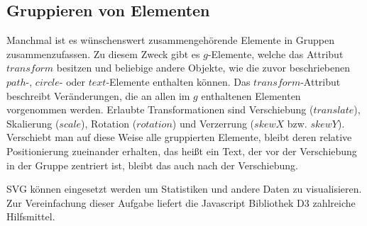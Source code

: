 \subsection{Gruppieren von Elementen}
Manchmal ist es wünschenswert zusammengehörende Elemente in Gruppen zusammenzufassen. Zu diesem Zweck gibt es $g$-Elemente, welche das Attribut $transform$ besitzen und beliebige andere Objekte, wie die zuvor beschriebenen $path$-, $circle$- oder $text$-Elemente enthalten können. Das $transform$-Attribut beschreibt Veränderungen, die an allen im $g$ enthaltenen Elementen vorgenommen werden. Erlaubte Transformationen sind  Verschiebung ($translate$), Skalierung ($scale$), Rotation ($rotation$) und Verzerrung ($skewX$ bzw. $skewY$). Verschiebt man auf diese Weise alle gruppierten Elemente, bleibt deren relative Positionierung zueinander erhalten, das heißt ein Text, der vor der Verschiebung in der Gruppe zentriert ist, bleibt das auch nach der Verschiebung.

SVG können eingesetzt werden um Statistiken und andere Daten zu visualisieren. Zur Vereinfachung dieser Aufgabe liefert die Javascript Bibliothek D3 zahlreiche Hilfsmittel.

